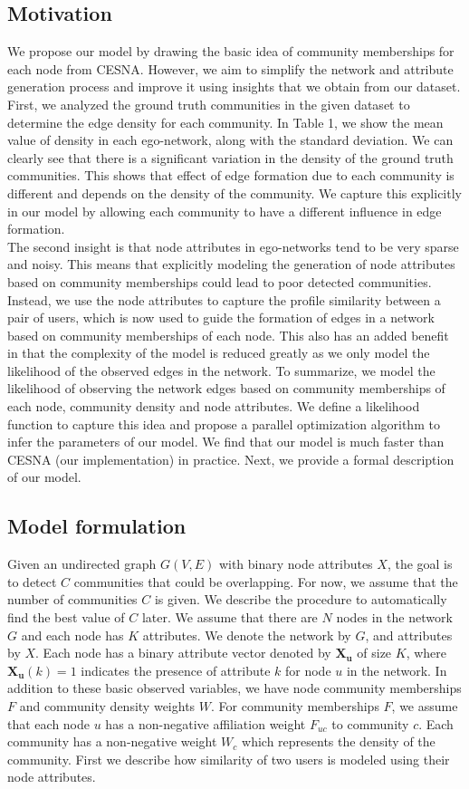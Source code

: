 \documentclass[11pt]{article}
\begin{document}
\subsection{Motivation}
We propose our model by drawing the basic idea of community memberships for each node from CESNA. However, we aim to simplify the network and attribute generation process and improve it using insights that we obtain from our dataset. First, we analyzed the ground truth communities in the given dataset to determine the edge density for each community. In Table 1, we show the mean value of density in each ego-network, along with the standard deviation. We can clearly see that there is a significant variation in the density of the ground truth communities. This shows that effect of edge formation due to each community is different and depends on the density of the community. We capture this explicitly in our model by allowing each community to have a different influence in edge formation.  \\[3pt]

The second insight is that node attributes in ego-networks tend to be very sparse and noisy. This means that explicitly modeling the generation of node attributes based on community memberships could lead to poor detected communities. Instead, we use the node attributes to capture the profile similarity between a pair of users, which is now used to guide the formation of edges in a network based on community memberships of each node. This also has an added benefit in that the complexity of the model is reduced greatly as we only model the likelihood of the observed edges in the network. To summarize, we model the likelihood of observing the network edges based on community memberships of each node, community density and node attributes. We define a likelihood function to capture this idea and propose a parallel optimization algorithm to infer the parameters of our model. We find that our model is much faster than CESNA (our implementation) in practice.
Next, we provide a formal description of our model. 

\subsection{Model formulation}
Given an undirected graph $G(V,E)$ with binary node attributes $X$,  the goal is to detect $C$ communities that could be overlapping. For now, we assume that the number of communities $C$ is given.  We describe the procedure to automatically find the best value of $C$ later.
We assume that there are $N$ nodes in the network $G$ and each node has $K$ attributes. We denote the network by $G$, and attributes by $X$.
Each node has a binary attribute vector denoted by $\mathbf{X_u}$ of size $K$,  
where $\mathbf{X_u} (k) = 1$ indicates the presence of attribute $k$ for node $u$ in the network. In addition to these basic observed variables, we have node community memberships $F$ and community density weights $W$. For community memberships $F$, we assume that each node $u$ has a non-negative affiliation weight $F_{uc}$ to community $c$. Each community has a non-negative weight $W_c$ which represents the density of the community. First we describe how similarity of two users is modeled using their node attributes. 
\end{document}
